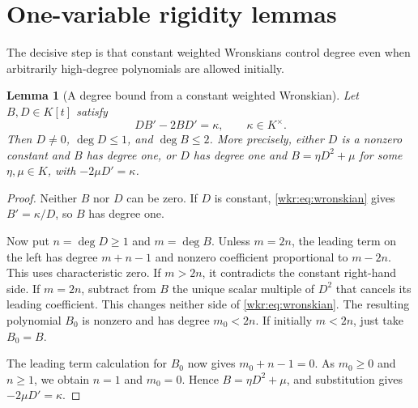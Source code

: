 \documentclass[11pt,a4paper]{article}
\numberwithin{equation}{section}
\newtheorem{lemma}[theorem]{Lemma}
\theoremstyle{definition}
\theoremstyle{remark}
\begin{document}
\section{One-variable rigidity lemmas}
\label{wkr:sec:lemmas}

The decisive step is that constant weighted Wronskians control degree even
when arbitrarily high-degree polynomials are allowed initially.

\begin{lemma}[A degree bound from a constant weighted Wronskian]
\label{wkr:lem:wronskian}
Let $B,D\in K[t]$ satisfy
\begin{equation}\label{wkr:eq:wronskian}
DB'-2BD'=\kappa,\qquad \kappa\in K^\times.
\end{equation}
Then $D\ne0$, $\deg D\le1$, and $\deg B\le2$. More precisely, either $D$
is a nonzero constant and $B$ has degree one, or $D$ has degree one and
$B=\eta D^2+\mu$ for some $\eta,\mu\in K$, with
$-2\mu D'=\kappa$.
\end{lemma}
\begin{proof}
Neither $B$ nor $D$ can be zero. If $D$ is constant, \eqref{wkr:eq:wronskian}
gives $B'=\kappa/D$, so $B$ has degree one.

Now put $n=\deg D\ge1$ and $m=\deg B$. Unless $m=2n$, the leading term
on the left has degree $m+n-1$ and nonzero coefficient proportional to
$m-2n$. This uses characteristic zero. If $m>2n$, it contradicts the
constant right-hand side. If $m=2n$, subtract from $B$ the unique scalar
multiple of $D^2$ that cancels its leading coefficient. This changes
neither side of \eqref{wkr:eq:wronskian}. The resulting polynomial $B_0$ is
nonzero and has degree $m_0<2n$. If initially $m<2n$, just take $B_0=B$.

The leading term calculation for $B_0$ now gives $m_0+n-1=0$. As
$m_0\ge0$ and $n\ge1$, we obtain $n=1$ and $m_0=0$. Hence
$B=\eta D^2+\mu$, and substitution gives $-2\mu D'=\kappa$.
\end{proof}
\end{document}
